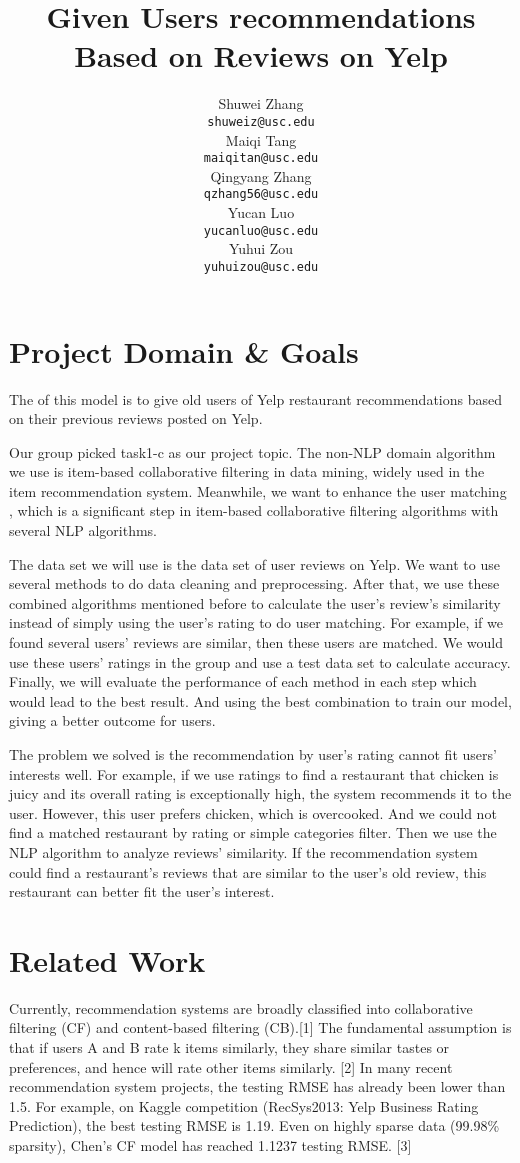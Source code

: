\documentclass[11pt]{article}
\title{Given Users recommendations Based on Reviews on Yelp }
\author{
  Shuwei Zhang \\
  {\tt shuweiz@usc.edu} \\\And
  Maiqi Tang \\
  {\tt maiqitan@usc.edu} \\\And
  Qingyang Zhang \\
  {\tt qzhang56@usc.edu} \\\And
   Yucan Luo \\
  {\tt yucanluo@usc.edu} \\\And
  Yuhui Zou \\
  {\tt yuhuizou@usc.edu}
  }
\date{}
\begin{document}
\maketitle

\section{Project Domain \& Goals}
The of this model is to give old users of Yelp restaurant recommendations based on their previous reviews posted on Yelp. 

Our group picked task1-c as our project topic. The non-NLP domain algorithm we use is item-based collaborative filtering in data mining, widely used in the item recommendation system. Meanwhile, we want to enhance the user matching , which is a significant step in item-based collaborative filtering algorithms with several NLP algorithms. 

The data set we will use is the data set of user reviews on Yelp. We want to use several methods to do data cleaning and preprocessing. After that, we use these combined algorithms mentioned before to calculate the user’s review’s similarity instead of simply using the user's rating to do user matching. For example, if we found several users’ reviews are similar, then these users are matched. We would use these users’ ratings in the group and use a test data set to calculate accuracy. Finally, we will evaluate the performance of each method in each step which would lead to the best result. And using the best combination to train our model, giving a better outcome for users.

The problem we solved is the recommendation by user's rating cannot fit users' interests well. For example, if we use ratings to find a restaurant that chicken is juicy and its overall rating is exceptionally high, the system recommends it to the user. However, this user prefers chicken, which is overcooked. And we could not find a matched restaurant by rating or simple categories filter. Then we use the NLP algorithm to analyze reviews' similarity. If the recommendation system could find a restaurant's reviews that are similar to the user's old review, this restaurant can better fit the user's interest.

\section{Related Work}
Currently, recommendation systems are broadly classified into collaborative filtering (CF) and content-based filtering (CB).[1] The fundamental assumption is that if users A and B rate k items similarly, they share similar tastes or preferences, and hence will rate other items similarly. [2] In many recent recommendation system projects, the testing RMSE has already been lower than 1.5. For example, on Kaggle competition (RecSys2013: Yelp Business Rating Prediction), the best testing RMSE is 1.19. Even on highly sparse data (99.98\% sparsity), Chen’s CF model has reached 1.1237 testing RMSE. [3]
\end{document}
